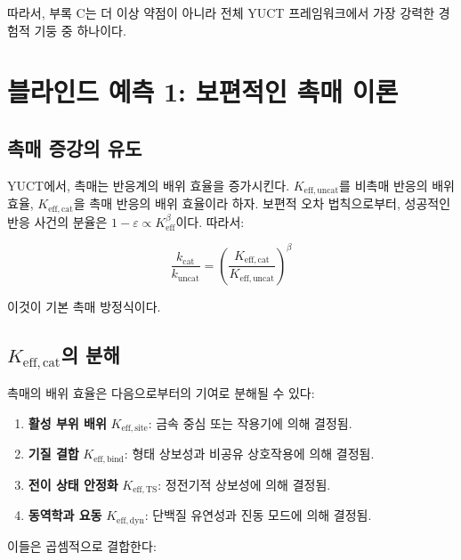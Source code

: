 \documentclass[12pt,a4paper]{article}
\newcommand{\Keff}{K_{\mathrm{eff}}}
\newcommand{\eps}{\varepsilon}
\begin{document}
	따라서, 부록 C는 더 이상 약점이 아니라 전체 YUCT 프레임워크에서 가장 강력한 경험적 기둥 중 하나이다.
	
	\section{블라인드 예측 1: 보편적인 촉매 이론}
	\label{sec:catalysis}
	
	\subsection{촉매 증강의 유도}
	
	YUCT에서, 촉매는 반응계의 배위 효율을 증가시킨다. \(K_{\mathrm{eff},\text{uncat}}\)를 비촉매 반응의 배위 효율, \(K_{\mathrm{eff},\text{cat}}\)을 촉매 반응의 배위 효율이라 하자. 보편적 오차 법칙으로부터, 성공적인 반응 사건의 분율은 $1 - \eps \propto \Keff^{\beta}$이다. 따라서:
	
	\begin{equation}
		\frac{k_{\text{cat}}}{k_{\text{uncat}}} = \left(\frac{K_{\mathrm{eff},\text{cat}}}{K_{\mathrm{eff},\text{uncat}}}\right)^{\beta}
		\label{eq:cat-enhancement}
	\end{equation}
	
	이것이 기본 촉매 방정식이다.
	
	\subsection{\(K_{\mathrm{eff},\text{cat}}\)의 분해}
	
	촉매의 배위 효율은 다음으로부터의 기여로 분해될 수 있다:
	\begin{enumerate}
		\item \textbf{활성 부위 배위} \(K_{\mathrm{eff},\text{site}}\): 금속 중심 또는 작용기에 의해 결정됨.
		\item \textbf{기질 결합} \(K_{\mathrm{eff},\text{bind}}\): 형태 상보성과 비공유 상호작용에 의해 결정됨.
		\item \textbf{전이 상태 안정화} \(K_{\mathrm{eff},\text{TS}}\): 정전기적 상보성에 의해 결정됨.
		\item \textbf{동역학과 요동} \(K_{\mathrm{eff},\text{dyn}}\): 단백질 유연성과 진동 모드에 의해 결정됨.
	\end{enumerate}
	
	이들은 곱셈적으로 결합한다:
	
\end{document}

